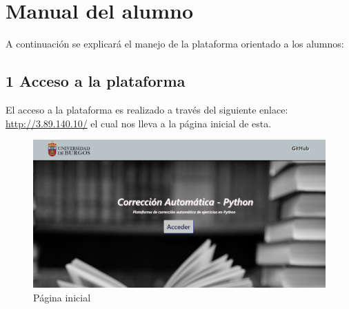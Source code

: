 \newpage

\section{Manual del alumno}
A continuación se explicará el manejo de la plataforma orientado a los alumnos:

\subsection{1 Acceso a la plataforma}
El acceso a la plataforma es realizado a través del siguiente enlace: \url{http://3.89.140.10/} el cual nos lleva a la página inicial de esta.

\begin{figure}[H]
    \centering
    \includegraphics[width=\textwidth]{img/imgs-memoria/Landing.PNG}
    \caption{Página inicial}
\end{figure}

